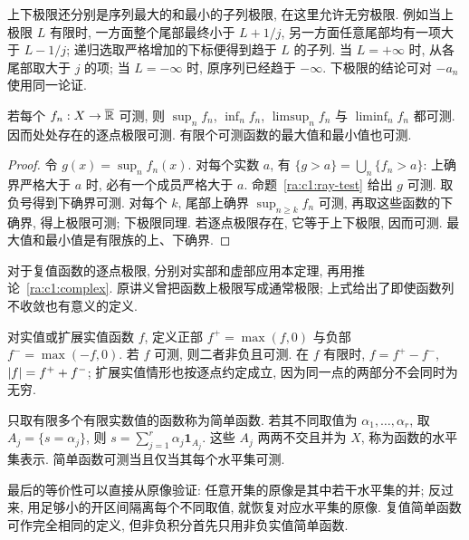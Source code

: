 上下极限还分别是序列最大的和最小的子列极限, 在这里允许无穷极限. 例如当上极限 $L$ 有限时, 一方面整个尾部最终小于 $L+1/j$, 另一方面任意尾部均有一项大于 $L-1/j$; 递归选取严格增加的下标便得到趋于 $L$ 的子列. 当 $L=+\infty$ 时, 从各尾部取大于 $j$ 的项; 当 $L=-\infty$ 时, 原序列已经趋于 $-\infty$. 下极限的结论可对 $-a_n$ 使用同一论证.

\begin{theorem}\label{ra:c1:limits}
若每个 $f_n:X\to\overline{\mathbb R}$ 可测, 则 $\sup_n f_n$, $\inf_n f_n$, $\limsup_n f_n$ 与 $\liminf_n f_n$ 都可测. 因而处处存在的逐点极限可测. 有限个可测函数的最大值和最小值也可测.
\end{theorem}
\begin{proof}
令 $g(x)=\sup_n f_n(x)$. 对每个实数 $a$, 有 $\{g>a\}=\bigcup_n\{f_n>a\}$: 上确界严格大于 $a$ 时, 必有一个成员严格大于 $a$. 命题~\ref{ra:c1:ray-test} 给出 $g$ 可测. 取负号得到下确界可测. 对每个 $k$, 尾部上确界 $\sup_{n\ge k}f_n$ 可测, 再取这些函数的下确界, 得上极限可测; 下极限同理. 若逐点极限存在, 它等于上下极限, 因而可测. 最大值和最小值是有限族的上、下确界.
\end{proof}
对于复值函数的逐点极限, 分别对实部和虚部应用本定理, 再用推论~\ref{ra:c1:complex}. 原讲义曾把函数上极限写成通常极限; 上式给出了即使函数列不收敛也有意义的定义.

\begin{definition}
对实值或扩展实值函数 $f$, 定义正部 $f^+=\max(f,0)$ 与负部 $f^-=\max(-f,0)$. 若 $f$ 可测, 则二者非负且可测. 在 $f$ 有限时, $f=f^+-f^-$, $\lvert f\rvert=f^++f^-$; 扩展实值情形也按逐点约定成立, 因为同一点的两部分不会同时为无穷.
\end{definition}

\begin{definition}
只取有限多个有限实数值的函数称为简单函数. 若其不同取值为 $\alpha_1,\ldots,\alpha_r$, 取 $A_j=\{s=\alpha_j\}$, 则 $s=\sum_{j=1}^{r}\alpha_j\mathbf1_{A_j}$. 这些 $A_j$ 两两不交且并为 $X$, 称为函数的水平集表示. 简单函数可测当且仅当其每个水平集可测.
\end{definition}
最后的等价性可以直接从原像验证: 任意开集的原像是其中若干水平集的并; 反过来, 用足够小的开区间隔离每个不同取值, 就恢复对应水平集的原像. 复值简单函数可作完全相同的定义, 但非负积分首先只用非负实值简单函数.

